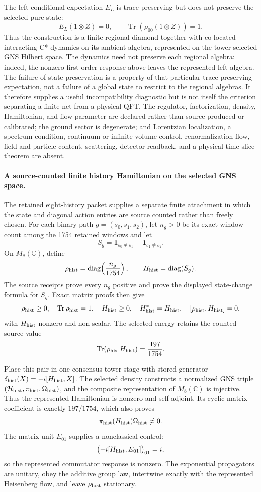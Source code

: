 \documentclass[11pt]{article}
\theoremstyle{remark}
\theoremstyle{plain}
\begin{document}
The left conditional expectation \(E_L\) is trace preserving but does not preserve
the selected pure state:
\[
 E_L(1\otimes Z)=0,
 \qquad
 \operatorname{Tr}(\rho_{00}(1\otimes Z))=1.
\]
Thus the construction is a finite regional diamond together with co-located
interacting C*-dynamics on its ambient algebra, represented on the
tower-selected GNS Hilbert space.  The dynamics need not preserve each
regional algebra: indeed, the nonzero first-order response above leaves the
represented left algebra.  The failure of state preservation is a
property of that particular trace-preserving expectation, not a failure of a
global state to restrict to the regional algebras.  It therefore supplies a
useful incompatibility diagnostic but is not itself the criterion separating
a finite net from a physical QFT.  The regulator, factorization, density,
Hamiltonian, and flow parameter are declared rather than source produced or
calibrated; the ground sector is degenerate; and Lorentzian localization, a
spectrum condition, continuum or infinite-volume control, renormalization
flow, field and particle content, scattering, detector readback, and a
physical time-slice theorem are absent.

\paragraph{A source-counted finite history Hamiltonian on the selected GNS
space.}
The retained eight-history packet supplies a separate finite attachment in
which the state and diagonal action entries are source counted rather than
freely chosen.  For each binary path
\(g=(s_0,s_1,s_2)\), let \(n_g>0\) be its exact window count among the
1754 retained windows and let
\[
 S_g=\mathbf 1_{s_0\ne s_1}+\mathbf 1_{s_1\ne s_2}.
\]
On \(M_8(\mathbb C)\), define
\[
 \rho_{\rm hist}=\operatorname{diag}\!\left(\frac{n_g}{1754}\right),
 \qquad
 H_{\rm hist}=\operatorname{diag}(S_g).
\]
The source receipts prove every \(n_g\) positive and prove the displayed
state-change formula for \(S_g\).  Exact matrix proofs then give
\[
 \rho_{\rm hist}\geq0,\quad \operatorname{Tr}\rho_{\rm hist}=1,\quad
 H_{\rm hist}\geq0,\quad H_{\rm hist}^{*}=H_{\rm hist},\quad
 [\rho_{\rm hist},H_{\rm hist}]=0,
\]
with \(H_{\rm hist}\) nonzero and non-scalar.  The selected energy retains the
counted source value
\[
 \operatorname{Tr}(\rho_{\rm hist}H_{\rm hist})
   =\frac{197}{1754}.
\]

Place this pair in one consensus-tower stage with stored generator
\(\delta_{\rm hist}(X)=-i[H_{\rm hist},X]\).  The selected density constructs
a normalized GNS triple
\((\mathcal H_{\rm hist},\pi_{\rm hist},\Omega_{\rm hist})\), and the
composite representation of \(M_8(\mathbb C)\) is injective.  Thus the
represented Hamiltonian is nonzero and self-adjoint.  Its cyclic matrix
coefficient is exactly \(197/1754\), which also proves
\[
 \pi_{\rm hist}(H_{\rm hist})\Omega_{\rm hist}\ne0.
\]
The matrix unit \(E_{01}\) supplies a nonclassical control:
\[
 \bigl(-i[H_{\rm hist},E_{01}]\bigr)_{01}=i,
\]
so the represented commutator response is nonzero.  The exponential
propagators are unitary, obey the additive group law, intertwine exactly with
the represented Heisenberg flow, and leave \(\rho_{\rm hist}\) stationary.
\end{document}
